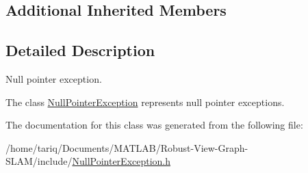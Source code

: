 \subsection*{Additional Inherited Members}


\subsection{Detailed Description}
Null pointer exception. 

The class \hyperlink{classNullPointerException}{Null\+Pointer\+Exception} represents null pointer exceptions. 

The documentation for this class was generated from the following file\+:\begin{DoxyCompactItemize}
\item 
/home/tariq/\+Documents/\+M\+A\+T\+L\+A\+B/\+Robust-\/\+View-\/\+Graph-\/\+S\+L\+A\+M/include/\hyperlink{NullPointerException_8h}{Null\+Pointer\+Exception.\+h}\end{DoxyCompactItemize}
